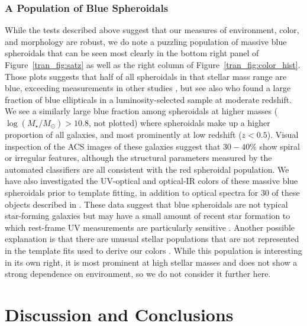 \subsubsection{A Population of Blue Spheroidals}

While the tests described above suggest that our measures of
environment, color, and morphology are robust, we do note a puzzling
population of massive blue spheroidals that can be seen most clearly
in the bottom right panel of Figure~\ref{tran_fig:satz} as well as the
right column of Figure~\ref{tran_fig:color_hist}. Those plots suggests
that half of all spheroidals in that stellar mass range are blue,
exceeding measurements in other studies \citep[e.g.][]{Kaviraj2007,
  Kaviraj2008, Bamford2009, Schawinksi2009, Ilbert2010}, but see also
\citet{Cross2004} who found a large fraction of blue ellipticals in a
luminosity-selected sample at moderate redshift. We see a similarly
large blue fraction among spheroidals at higher masses
($\log(M_{\star}/M_{\odot}) > 10.8$, not plotted) where spheroidals make up a
higher proportion of all galaxies, and most prominently at low
redshift ($z<0.5$). Visual inspection of the ACS images of these
galaxies suggest that $30-40\%$ show spiral or irregular features,
although the structural parameters measured by the automated
classifiers are all consistent with the red spheroidal population. We
have also investigated the UV-optical and optical-IR colors of these
massive blue spheroidals prior to template fitting, in addition to
optical spectra for $30$ of these objects described in
\citet{George2011}. These data suggest that blue spheroidals are not
typical star-forming galaxies but may have a small amount of recent
star formation to which rest-frame UV measurements are particularly
sensitive \citep[e.g.][]{Kaviraj2007, Kaviraj2008}. Another possible
explanation is that there are unusual stellar populations that are not
represented in the template fits used to derive our \nuvr colors
\citep[see e.g.][for a discussion of galaxy properties contributing to
the ``UV upturn'']{Smith2012}. While this population is interesting in
its own right, it is most prominent at high stellar masses and does
not show a strong dependence on environment, so we do not consider it
further here.

\section{Discussion and Conclusions}
\label{tran_s:discussion}

